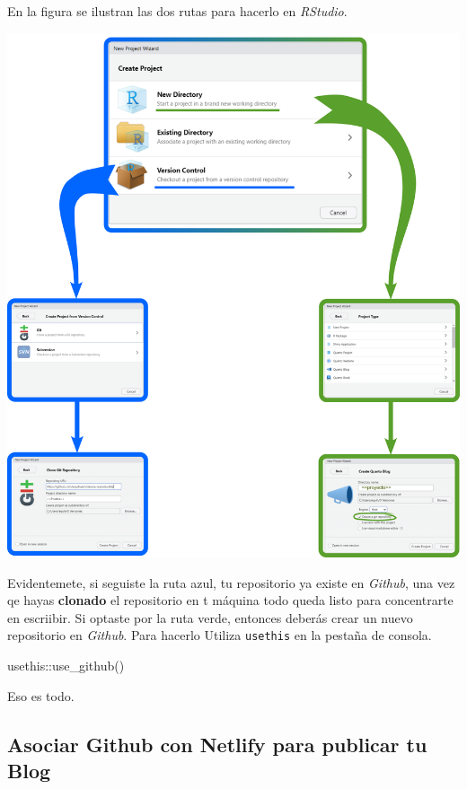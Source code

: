 \documentclass[
  letterpaper,
  DIV=11,
  numbers=noendperiod]{scrartcl}
\newenvironment{Shaded}{\begin{snugshade}}{\end{snugshade}}
\newcommand{\FunctionTok}[1]{\textcolor[rgb]{0.28,0.35,0.67}{#1}}
\newcommand{\NormalTok}[1]{\textcolor[rgb]{0.00,0.23,0.31}{#1}}
\newcommand{\SpecialCharTok}[1]{\textcolor[rgb]{0.37,0.37,0.37}{#1}}
\begin{document}
En la figura se ilustran las dos rutas para hacerlo en \emph{RStudio}.

\includegraphics{images/proyecto-con-git.png}

Evidentemete, si seguiste la ruta azul, tu repositorio ya existe en
\emph{Github}, una vez qe hayas \textbf{clonado} el repositorio en t
máquina todo queda listo para concentrarte en escriibir. Si optaste por
la ruta verde, entonces deberás crear un nuevo repositorio en
\emph{Github}. Para hacerlo Utiliza \texttt{usethis} en la pestaña de
consola.

\begin{Shaded}
\begin{Highlighting}[]
\NormalTok{usethis}\SpecialCharTok{::}\FunctionTok{use\_github}\NormalTok{()}
\end{Highlighting}
\end{Shaded}

Eso es todo.

\hfill\break

\subsection{Asociar Github con Netlify para publicar tu
Blog}\label{asociar-github-con-netlify-para-publicar-tu-blog}
\end{document}
